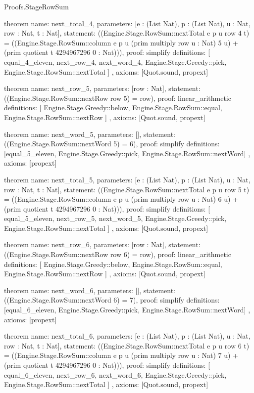 \begin{lexlean}{Proofs.StageRowSum}
\begin{semanticmodule}
theorem{
  name: next_total_4,
  parameters: [e : (List Nat), p : (List Nat), u : Nat, row : Nat, t : Nat],
  statement: ((Engine.Stage.RowSum::nextTotal e p u row 4 t) = ((Engine.Stage.RowSum::column e p u (prim multiply row u : Nat) 5 u) + (prim quotient t 4294967296 0 : Nat))),
  proof: simplify{
    definitions: [
      equal_4_eleven,
      next_row_4,
      next_word_4,
      Engine.Stage.Greedy::pick,
      Engine.Stage.RowSum::nextTotal
    ]
  },
  axioms: [Quot.sound, propext]
}

theorem{
  name: next_row_5,
  parameters: [row : Nat],
  statement: ((Engine.Stage.RowSum::nextRow row 5) = row),
  proof: linear_arithmetic{
    definitions: [
      Engine.Stage.Greedy::below,
      Engine.Stage.RowSum::equal,
      Engine.Stage.RowSum::nextRow
    ]
  },
  axioms: [Quot.sound, propext]
}

theorem{
  name: next_word_5,
  parameters: [],
  statement: ((Engine.Stage.RowSum::nextWord 5) = 6),
  proof: simplify{
    definitions: [equal_5_eleven, Engine.Stage.Greedy::pick, Engine.Stage.RowSum::nextWord]
  },
  axioms: [propext]
}

theorem{
  name: next_total_5,
  parameters: [e : (List Nat), p : (List Nat), u : Nat, row : Nat, t : Nat],
  statement: ((Engine.Stage.RowSum::nextTotal e p u row 5 t) = ((Engine.Stage.RowSum::column e p u (prim multiply row u : Nat) 6 u) + (prim quotient t 4294967296 0 : Nat))),
  proof: simplify{
    definitions: [
      equal_5_eleven,
      next_row_5,
      next_word_5,
      Engine.Stage.Greedy::pick,
      Engine.Stage.RowSum::nextTotal
    ]
  },
  axioms: [Quot.sound, propext]
}

theorem{
  name: next_row_6,
  parameters: [row : Nat],
  statement: ((Engine.Stage.RowSum::nextRow row 6) = row),
  proof: linear_arithmetic{
    definitions: [
      Engine.Stage.Greedy::below,
      Engine.Stage.RowSum::equal,
      Engine.Stage.RowSum::nextRow
    ]
  },
  axioms: [Quot.sound, propext]
}

theorem{
  name: next_word_6,
  parameters: [],
  statement: ((Engine.Stage.RowSum::nextWord 6) = 7),
  proof: simplify{
    definitions: [equal_6_eleven, Engine.Stage.Greedy::pick, Engine.Stage.RowSum::nextWord]
  },
  axioms: [propext]
}

theorem{
  name: next_total_6,
  parameters: [e : (List Nat), p : (List Nat), u : Nat, row : Nat, t : Nat],
  statement: ((Engine.Stage.RowSum::nextTotal e p u row 6 t) = ((Engine.Stage.RowSum::column e p u (prim multiply row u : Nat) 7 u) + (prim quotient t 4294967296 0 : Nat))),
  proof: simplify{
    definitions: [
      equal_6_eleven,
      next_row_6,
      next_word_6,
      Engine.Stage.Greedy::pick,
      Engine.Stage.RowSum::nextTotal
    ]
  },
  axioms: [Quot.sound, propext]
}


\end{semanticmodule}
\end{lexlean}
